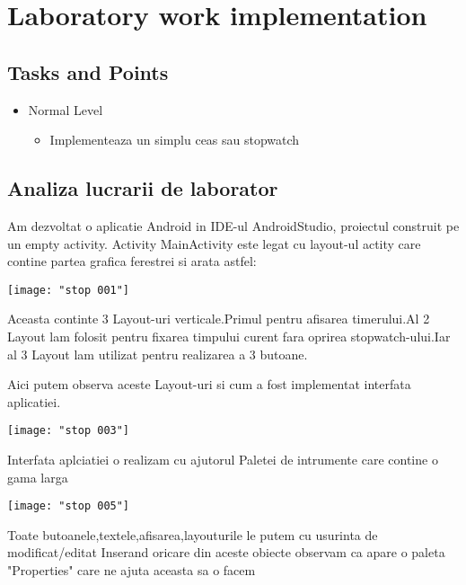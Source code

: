 \section{Laboratory work implementation}

\subsection{Tasks and Points}

\begin{itemize}
	\item Normal Level 
	\begin{itemize}
		\item Implementeaza un simplu ceas sau stopwatch
	\end{itemize}
\end{itemize}

\subsection{Analiza lucrarii de laborator}

Am dezvoltat o aplicatie Android in IDE-ul AndroidStudio, proiectul construit pe un empty activity.
Activity MainActivity este legat cu layout-ul actity care contine partea grafica ferestrei si arata astfel:

\begin{center}
\texttt{[image: "stop 001"]}
\end{center}


Aceasta continte 3 Layout-uri verticale.Primul pentru afisarea timerului.Al 2 Layout lam folosit pentru fixarea timpului curent fara oprirea stopwatch-ului.Iar al 3 Layout lam utilizat pentru realizarea a 3 butoane.



Aici putem observa aceste Layout-uri si cum a fost implementat interfata aplicatiei.

\begin{center}
\texttt{[image: "stop 003"]}
\end{center}

Interfata aplciatiei o realizam cu ajutorul Paletei de intrumente care contine o gama larga


\begin{center}
\texttt{[image: "stop 005"]}
\end{center}

Toate butoanele,textele,afisarea,layouturile le putem cu usurinta de modificat/editat Inserand oricare din aceste obiecte observam ca apare o paleta "Properties" care ne ajuta aceasta sa o facem

